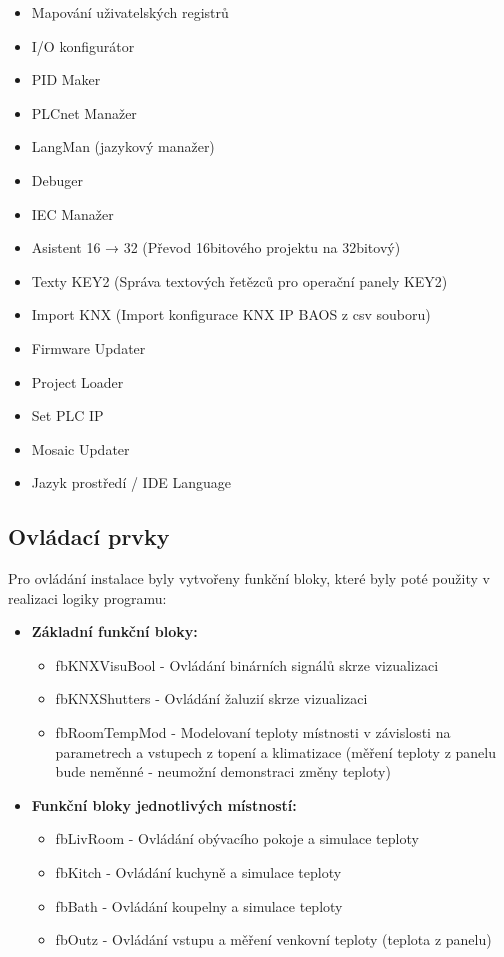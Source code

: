 \begin{itemize}
\begin{itemize}
        \item Mapování uživatelských registrů
        \item I/O konfigurátor
        \item PID Maker
        \item PLCnet Manažer
        \item LangMan (jazykový manažer)
        \item Debuger
        \item IEC Manažer
        \item Asistent 16 → 32 (Převod 16bitového projektu na 32bitový)
        \item Texty KEY2 (Správa textových řetězců pro operační panely KEY2)
        \item Import KNX (Import konfigurace KNX IP BAOS z csv souboru)
        \item Firmware Updater
        \item Project Loader
        \item Set PLC IP
        \item Mosaic Updater
        \item Jazyk prostředí / IDE Language
    \end{itemize}
\end{itemize}

\subsection{Ovládací prvky}
Pro ovládání instalace byly vytvořeny funkční bloky, které byly poté použity v realizaci logiky programu:

\begin{itemize}
    \item \textbf{Základní funkční bloky:}
        \begin{itemize}
            \item fbKNXVisuBool - Ovládání binárních signálů skrze vizualizaci
            \item fbKNXShutters - Ovládání žaluzií skrze vizualizaci
            \item fbRoomTempMod - Modelovaní teploty místnosti v závislosti na parametrech a vstupech z topení a klimatizace (měření teploty z panelu bude neměnné - neumožní demonstraci změny teploty)
        \end{itemize}
    \item \textbf{Funkční bloky jednotlivých místností:}
        \begin{itemize}
            \item fbLivRoom - Ovládání obývacího pokoje a simulace teploty
            \item fbKitch - Ovládání kuchyně a simulace teploty
            \item fbBath - Ovládání koupelny a simulace teploty
            \item fbOutz - Ovládání vstupu a měření venkovní teploty (teplota z panelu) \newline
        \end{itemize}
\end{itemize}

